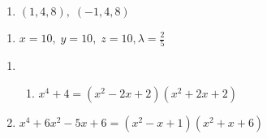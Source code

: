 \begin{enumerate}
\setcounter{enumi}{\value{HW}}

\item $(1, 4, 8), \; (-1, 4, 8)$


\setcounter{HW}{\value{enumi}}
\end{enumerate}

\begin{enumerate}
\setcounter{enumi}{\value{HW}}

\item $x = 10, \; y = 10, \; z = 10, \lambda = \frac{2}{5}$

\setcounter{HW}{\value{enumi}}
\end{enumerate}

\begin{enumerate}
\setcounter{enumi}{\value{HW}}

\item \begin{enumerate} 

\addtocounter{enumii}{2}

\item $x^{4} + 4 = (x^{2} - 2x + 2)(x^{2} + 2x + 2)$

\end{enumerate}

\item $x^{4} + 6x^{2} - 5x + 6 = (x^{2} - x + 1)(x^{2} + x + 6)$

\end{enumerate}
